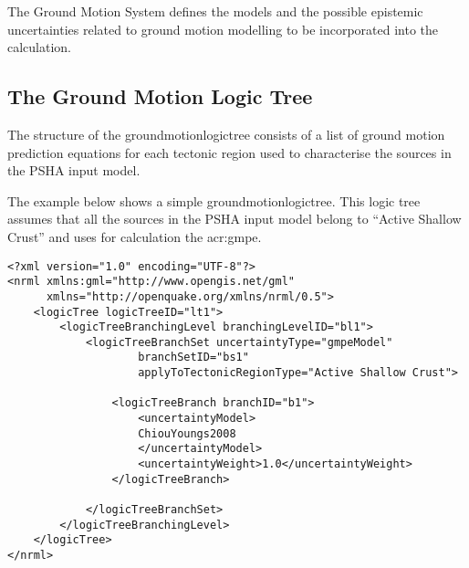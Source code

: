 The Ground Motion System defines the models and the possible epistemic
uncertainties related to ground motion modelling to be incorporated into the
calculation.

\subsection{The Ground Motion Logic Tree}
\label{subsec:gmlt}

The structure of the \gls{groundmotionlogictree} consists of a list of ground
motion prediction equations for each tectonic region used to characterise the
sources in the PSHA input model.

The example below shows a simple \gls{groundmotionlogictree}. This logic tree
assumes that all the sources in the PSHA input model belong to ``Active
Shallow Crust'' and uses for calculation the \citet{chiou2008}
\gls{acr:gmpe}.

\begin{verbatim}
<?xml version="1.0" encoding="UTF-8"?>
<nrml xmlns:gml="http://www.opengis.net/gml"
      xmlns="http://openquake.org/xmlns/nrml/0.5">
    <logicTree logicTreeID="lt1">
        <logicTreeBranchingLevel branchingLevelID="bl1">
            <logicTreeBranchSet uncertaintyType="gmpeModel"
                    branchSetID="bs1"
                    applyToTectonicRegionType="Active Shallow Crust">

                <logicTreeBranch branchID="b1">
                    <uncertaintyModel>
                    ChiouYoungs2008
                    </uncertaintyModel>
                    <uncertaintyWeight>1.0</uncertaintyWeight>
                </logicTreeBranch>

            </logicTreeBranchSet>
        </logicTreeBranchingLevel>
    </logicTree>
</nrml>
\end{verbatim}